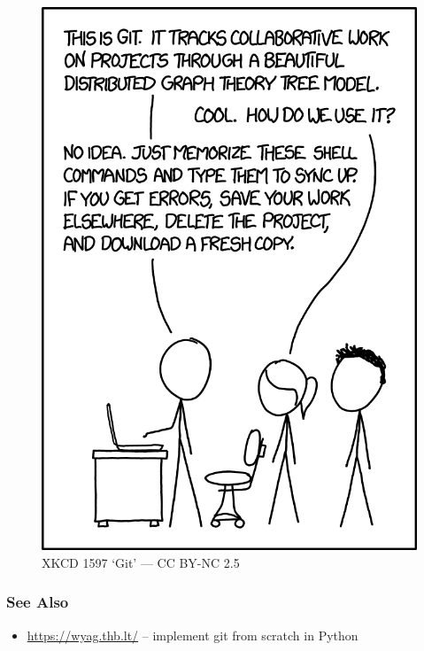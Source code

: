 \documentclass{beamer} \usetheme{Madrid}
\begin{document}
\begin{frame}
    \begin{figure}
        \includegraphics[height=\textheight-2cm]{xkcd.png}
        \caption{XKCD 1597 `Git' --- CC BY-NC 2.5}
    \end{figure}
\end{frame}

\begin{frame}
    \frametitle{See Also}
    \begin{itemize}
        \item \url{https://wyag.thb.lt/} -- implement git from scratch in Python
    \end{itemize}
\end{frame}
\end{document}
